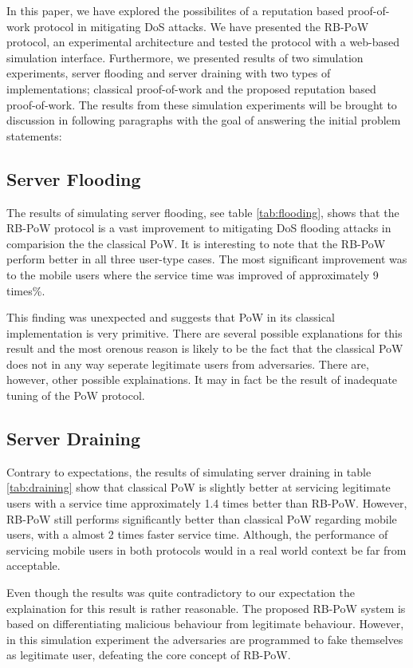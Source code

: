 In this paper, we have explored the possibilites of a reputation based proof-of-work protocol in mitigating DoS attacks. We have presented the RB-PoW protocol, an experimental architecture and tested the protocol with a web-based simulation interface. Furthermore, we presented results of two simulation experiments, server flooding and server draining with two types of implementations; classical proof-of-work and the proposed reputation based proof-of-work. The results from these simulation experiments will be brought to discussion in following paragraphs with the goal of answering the initial problem statements:

\subsection{Server Flooding}
The results of simulating server flooding, see table \ref{tab:flooding}, shows that the RB-PoW protocol is a vast improvement to mitigating DoS flooding attacks in comparision the the classical PoW. It is interesting to note that the RB-PoW perform better in all three user-type cases. The most significant improvement was to the mobile users where the service time was improved of approximately 9 times\%. 

This finding was unexpected and suggests that PoW in its classical implementation is very primitive.
There are several possible explanations for this result and the most orenous reason is likely to be the fact that the classical PoW does not in any way seperate legitimate users from adversaries.
There are, however, other possible explainations. It may in fact be the result of inadequate tuning of the PoW protocol. 

\subsection{Server Draining}

Contrary to expectations, the results of simulating server draining in table \ref{tab:draining} show that classical PoW is slightly better at servicing legitimate users with a service time approximately 1.4 times better than RB-PoW. However, RB-PoW still performs significantly better than classical PoW regarding mobile users, with a almost 2 times faster service time. Although, the performance of servicing mobile users in both protocols would in a real world context be far from acceptable.

Even though the results was quite contradictory to our expectation the explaination for this result is rather reasonable. The proposed RB-PoW system is based on differentiating malicious behaviour from legitimate behaviour. However, in this simulation experiment the adversaries are programmed to fake themselves as legitimate user, defeating the core concept of RB-PoW.




